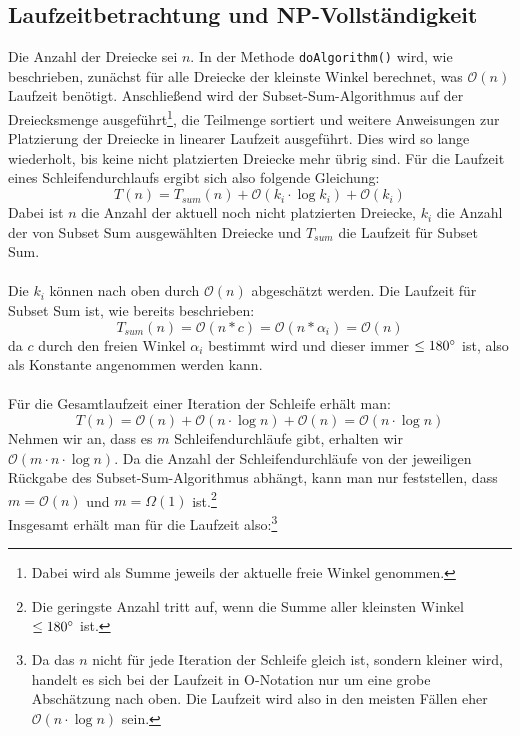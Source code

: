 \documentclass[a4paper, notitlepage, 12pt,headinclude]{scrartcl}
\begin{document}
 \subsection{Laufzeitbetrachtung und NP-Vollständigkeit}
 Die Anzahl der Dreiecke sei $n$. In der Methode \texttt{doAlgorithm()} wird, wie beschrieben, zunächst für alle Dreiecke der kleinste Winkel berechnet, was $\mathcal{O}(n)$ Laufzeit benötigt. Anschließend wird der Subset-Sum-Algorithmus auf der Dreiecksmenge ausgeführt\footnote{Dabei wird als Summe jeweils der aktuelle freie Winkel genommen.}, die Teilmenge sortiert und weitere Anweisungen zur Platzierung der Dreiecke in linearer Laufzeit ausgeführt. Dies wird so lange wiederholt, bis keine nicht platzierten Dreiecke mehr übrig sind. Für die Laufzeit eines Schleifendurchlaufs ergibt sich also folgende Gleichung:
 \begin{equation}
 T(n) = T_{sum}(n) + \mathcal{O}(k_i \cdot \log k_i) + \mathcal{O}(k_i)
 \end{equation}
Dabei ist $n$ die Anzahl der aktuell noch nicht platzierten Dreiecke, $k_i$ die Anzahl der von Subset Sum ausgewählten Dreiecke und $T_{sum}$ die Laufzeit für Subset Sum. \\ \\
Die $k_i$ können nach oben durch $\mathcal{O}(n)$ abgeschätzt werden. Die Laufzeit für Subset Sum ist, wie bereits beschrieben:
\begin{equation}
T_{sum}(n) = \mathcal{O}(n * c) = \mathcal{O}(n * \alpha_i) = \mathcal{O}(n)
\end{equation}
da $c$ durch den freien Winkel $\alpha_i$ bestimmt wird und dieser immer $\leq 180\degree$ ist, also als Konstante angenommen werden kann. \\ \\
Für die Gesamtlaufzeit einer Iteration der Schleife erhält man:
 \begin{equation}
T(n) = \mathcal{O}(n) + \mathcal{O}(n \cdot \log n) + \mathcal{O}(n) = \mathcal{O}(n \cdot \log n)
\end{equation}
Nehmen wir an, dass es $m$ Schleifendurchläufe gibt, erhalten wir $\mathcal{O}(m \cdot n \cdot \log n)$. Da die Anzahl der Schleifendurchläufe von der jeweiligen Rückgabe des Subset-Sum-Algorithmus abhängt, kann man nur feststellen, dass $m = \mathcal{O}(n)$ und $m = \Omega(1)$ ist.\footnote{Die geringste Anzahl tritt auf, wenn die Summe aller kleinsten Winkel $\leq 180\degree$ ist.} \\
Insgesamt erhält man für die Laufzeit also:\footnote{Da das $n$ nicht für jede Iteration der Schleife gleich ist, sondern kleiner wird, handelt es sich bei der Laufzeit in O-Notation nur um eine grobe Abschätzung nach oben. Die Laufzeit wird also in den meisten Fällen eher $\mathcal{O}(n \cdot \log n)$ sein.}
\end{document}
